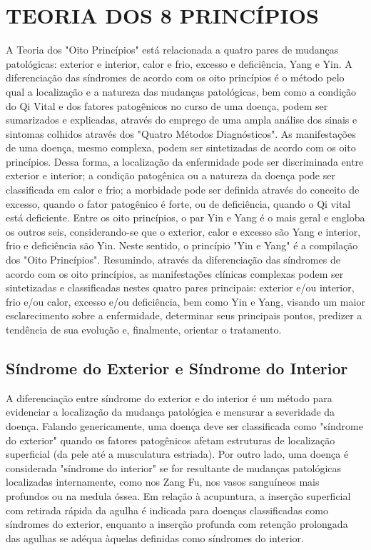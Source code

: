 \documentclass[12pt,oneside,a4paper]{book} %
\begin{document}
\tableofcontents
\listoftables





\chapter{TEORIA DOS 8 PRINCÍPIOS}

A Teoria dos "Oito Princípios" está relacionada a quatro pares de mudanças patológicas: exterior e interior, calor e frio, excesso e deficiência, Yang e Yin. A diferenciação das síndromes de acordo com os oito princípios é o método pelo qual a localização e a natureza das mudanças patológicas, bem como a condição do Qi Vital e dos fatores patogênicos no curso de uma doença, podem ser sumarizados e explicadas, através do emprego de uma ampla análise dos sinais e sintomas colhidos através dos "Quatro Métodos Diagnósticos".
As manifestações de uma doença, mesmo complexa, podem ser sintetizadas de acordo com os oito princípios. Dessa forma, a localização da enfermidade pode ser discriminada entre exterior e interior; a condição patogênica ou a natureza da doença pode ser classificada em calor e frio; a morbidade pode ser definida através do conceito de excesso, quando o fator patogênico é forte, ou de deficiência, quando o Qi vital está deficiente. Entre os oito princípios, o par Yin e Yang é o mais geral e engloba os outros seis, considerando-se que o exterior, calor e excesso são Yang e interior, frio e deficiência são Yin. Neste sentido, o princípio "Yin e Yang" é a compilação dos "Oito Princípios". 
Resumindo, através da diferenciação das síndromes de acordo com os oito princípios, as manifestações clínicas complexas podem ser sintetizadas e classificadas nestes quatro pares principais: exterior e/ou interior, frio e/ou calor, excesso e/ou deficiência, bem como Yin e Yang, visando um maior esclarecimento sobre a enfermidade, determinar seus principais pontos, predizer a tendência de sua evolução e, finalmente, orientar o tratamento.

\section{Síndrome do Exterior e Síndrome do Interior} 

A diferenciação entre síndrome do exterior e do interior é um método para evidenciar a localização da mudança patológica e mensurar a severidade da doença. Falando genericamente, uma doença deve ser classificada como "síndrome do exterior" quando os fatores patogênicos afetam estruturas de localização superficial (da pele até a musculatura estriada). Por outro lado, uma doença é considerada "síndrome do interior" se for resultante de mudanças patológicas localizadas internamente, como nos Zang Fu, nos vasos sanguíneos mais profundos ou na medula óssea. Em relação à acupuntura, a inserção superficial com retirada rápida da agulha é indicada para doenças classificadas como síndromes do exterior, enquanto a inserção profunda com retenção prolongada das agulhas se adéqua àquelas definidas como síndromes do interior.
\end{document}
